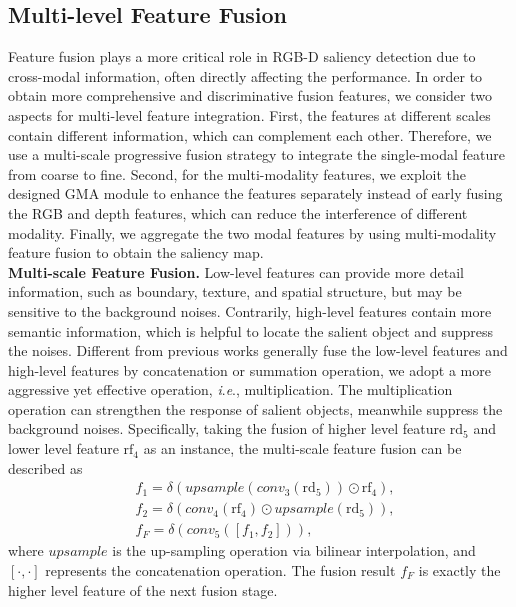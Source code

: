 \documentclass[journal]{IEEEtran}
\newcommand{\ie}{\textit{i}.\textit{e}.}
\begin{document}
\subsection{Multi-level Feature Fusion}
Feature fusion plays a more critical role in RGB-D saliency detection due to cross-modal information, often directly affecting the performance. In order to obtain more comprehensive and discriminative fusion features, we consider two aspects for multi-level feature integration. First, the features at different scales contain different information, which can complement each other. Therefore, we use a multi-scale progressive fusion strategy to integrate the single-modal feature from coarse to fine. Second, for the multi-modality features, we exploit the designed GMA module to enhance the features separately instead of early fusing the RGB and depth features, which can reduce the interference of different modality. Finally, we aggregate the two modal features by using multi-modality feature fusion to obtain the saliency map.\\
\indent \textbf{Multi-scale Feature Fusion.} Low-level features can provide more detail information, such as boundary, texture, and spatial structure, but may be sensitive to the background noises. Contrarily, high-level features contain more semantic information, which is helpful to locate the salient object and suppress the noises. Different from previous works \cite{Qin_2019_CVPR,Liu2019PoolSal} generally fuse the low-level features and high-level features  by concatenation or summation operation, we adopt a more aggressive yet effective operation, \ie, multiplication. The multiplication operation can strengthen the response of salient objects, meanwhile suppress the background noises. Specifically, taking the fusion of higher level feature $\mathrm{rd}_5$ and lower level feature $\mathrm{rf}_4$ as an instance, the multi-scale feature fusion can be described as
\begin{align}
&f_1 = \delta(upsample({conv}_3(\mathrm{rd}_5)) \odot \mathrm{rf}_4), \label{eq:12} \\
&f_2 = \delta (conv_4 (\mathrm{rf}_4) \odot upsample(\mathrm{rd}_5)),\label{eq:13}  \\
&f_{F} = \delta(conv_5 ([f_1, f_2])),
\end{align}
where $upsample$ is the up-sampling operation via bilinear interpolation, and $[\cdot,\cdot]$ represents the concatenation operation.
The fusion result $f_{F}$ is exactly the higher level feature of the next fusion stage. \\
\end{document}
